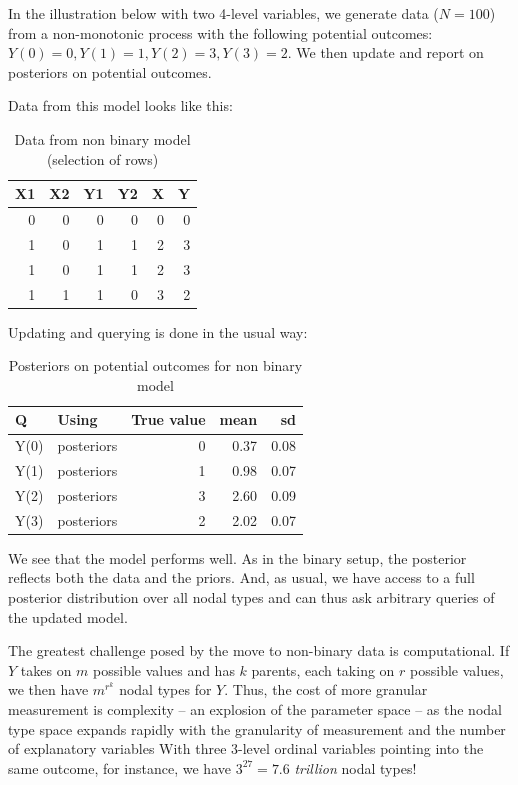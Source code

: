 \documentclass[
  12pt,
]{book}
\begin{document}
In the illustration below with two 4-level variables, we generate data (\(N=100\)) from a non-monotonic process with the following potential outcomes: \(Y(0)=0, Y(1)=1, Y(2)=3, Y(3) = 2\). We then update and report on posteriors on potential outcomes.

Data from this model looks like this:

\begin{table}

\caption{\label{tab:unnamed-chunk-17}Data from non binary model (selection of rows)}
\centering
\begin{tabular}[t]{r|r|r|r|r|r}
\hline
X1 & X2 & Y1 & Y2 & X & Y\\
\hline
0 & 0 & 0 & 0 & 0 & 0\\
\hline
1 & 0 & 1 & 1 & 2 & 3\\
\hline
1 & 0 & 1 & 1 & 2 & 3\\
\hline
1 & 1 & 1 & 0 & 3 & 2\\
\hline
\end{tabular}
\end{table}

Updating and querying is done in the usual way:

\begin{table}

\caption{\label{tab:unnamed-chunk-19}Posteriors on potential outcomes for non binary model}
\centering
\begin{tabular}[t]{l|l|r|r|r}
\hline
Q & Using & True value & mean & sd\\
\hline
Y(0) & posteriors & 0 & 0.37 & 0.08\\
\hline
Y(1) & posteriors & 1 & 0.98 & 0.07\\
\hline
Y(2) & posteriors & 3 & 2.60 & 0.09\\
\hline
Y(3) & posteriors & 2 & 2.02 & 0.07\\
\hline
\end{tabular}
\end{table}

We see that the model performs well. As in the binary setup, the posterior reflects both the data and the priors. And, as usual, we have access to a full posterior distribution over all nodal types and can thus ask arbitrary queries of the updated model.

The greatest challenge posed by the move to non-binary data is computational. If \(Y\) takes on \(m\) possible values and has \(k\) parents, each taking on \(r\) possible values, we then have \(m^{r^k}\) nodal types for \(Y\). Thus, the cost of more granular measurement is complexity -- an explosion of the parameter space -- as the nodal type space expands rapidly with the granularity of measurement and the number of explanatory variables With three 3-level ordinal variables pointing into the same outcome, for instance, we have \(3^{27} = 7.6\) \emph{trillion} nodal types!
\end{document}
